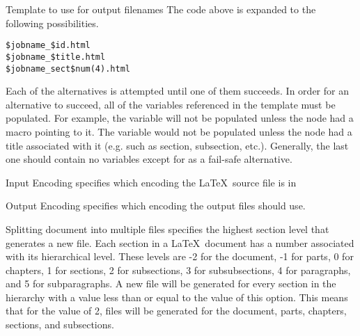 \begin{configuration}{Template to use for output filenames}
The code above is expanded to the following possibilities.

\begin{verbatim}
$jobname_$id.html
$jobname_$title.html
$jobname_sect$num(4).html
\end{verbatim}

Each of the alternatives is attempted until one of them succeeds.
In order for an alternative to succeed, all of the variables referenced
in the template must be populated.  For example, the  variable
will not be populated unless the node had a  macro
pointing to it.  The  variable would not be populated unless
the node had a title associated with it (e.g. such as section, subsection, etc.).
Generally, the last one should contain no variables except for
 as a fail-safe alternative.
\end{configuration}

\begin{configuration}{Input Encoding}
specifies which encoding the \LaTeX\ source file is in
\end{configuration}

\begin{configuration}{Output Encoding}
specifies which encoding the output files should use.  
\end{configuration}

\begin{configuration}{Splitting document into multiple files}
specifies the highest section level that generates a new file.  Each section
in a \LaTeX\ document has a number associated with its hierarchical level.
These levels are -2 for the document, -1 for parts, 0 for chapters,
1 for sections, 2 for subsections, 3 for subsubsections, 4 for paragraphs,
and 5 for subparagraphs.  A new file will be generated for every section
in the hierarchy with a value less than or equal to the value of this 
option.  This means that for the value of 2, files will be generated for
the document, parts, chapters, sections, and subsections.
\end{configuration}


